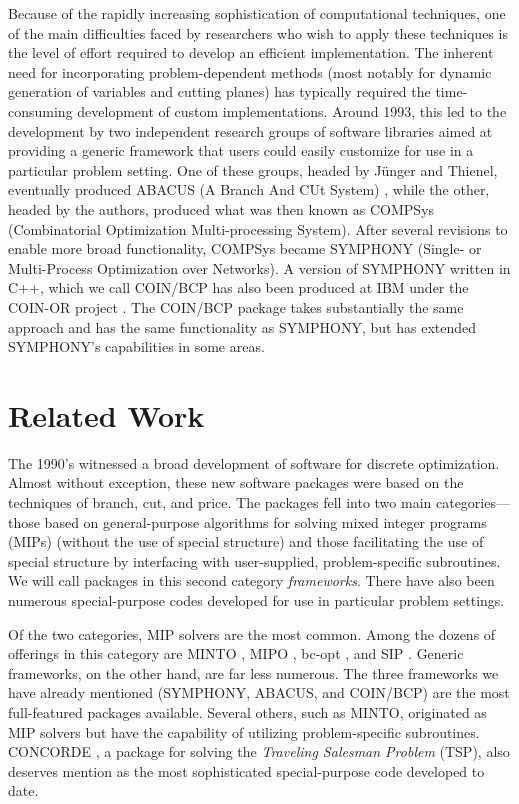 Because of the rapidly increasing sophistication of computational
techniques, one of the main difficulties faced by researchers who wish
to apply these techniques is the level of effort required to develop
an efficient implementation. The inherent need for incorporating
problem-dependent methods (most notably for dynamic generation of
variables and cutting planes) has typically required the
time-consuming development of custom implementations. Around 1993,
this led to the development by two independent research groups of
software libraries aimed at providing a generic framework that users
could easily customize for use in a particular problem setting. One of
these groups, headed by J\"unger and Thienel, eventually produced
ABACUS (A Branch And CUt System) \cite{abacus1}, while the other,
headed by the authors, produced what was then known as COMPSys
(Combinatorial Optimization Multi-processing System). After several
revisions to enable more broad functionality, COMPSys became SYMPHONY
(Single- or Multi-Process Optimization over Networks). 
A version of SYMPHONY written in C++, which we call
COIN/BCP has also been produced at IBM under the COIN-OR project
\cite{coin-or}. The COIN/BCP package takes substantially the same
approach and has the same functionality as SYMPHONY, but has extended
SYMPHONY's capabilities in some areas.

\section{Related Work}
\label{related}

The 1990's witnessed a broad development of software for discrete
optimization. Almost without exception, these new software packages
were based on the techniques of branch, cut, and price. The packages
fell into two main categories---those based on general-purpose
algorithms for solving mixed integer programs (MIPs)
(without the use of special structure)
and those facilitating the use of special structure by interfacing
with user-supplied, problem-specific subroutines. We will call
packages in this second category {\em frameworks}. There have also
been numerous special-purpose codes developed for use in particular
problem settings.

Of the two categories, MIP solvers are the most common. Among the
dozens of offerings in this category are MINTO \cite{MINTO}, MIPO
\cite{MIPO}, bc-opt \cite{bc-opt}, and SIP \cite{SIP}. Generic
frameworks, on the other hand, are far less numerous. The three
frameworks we have already mentioned (SYMPHONY, ABACUS, and COIN/BCP)
are the most full-featured packages available. Several others, such as
MINTO, originated as MIP solvers but have the capability of utilizing
problem-specific subroutines. CONCORDE \cite{concorde, concorde2}, a
package for solving the {\em Traveling Salesman Problem} (TSP), also
deserves mention as the most sophisticated special-purpose code
developed to date.

